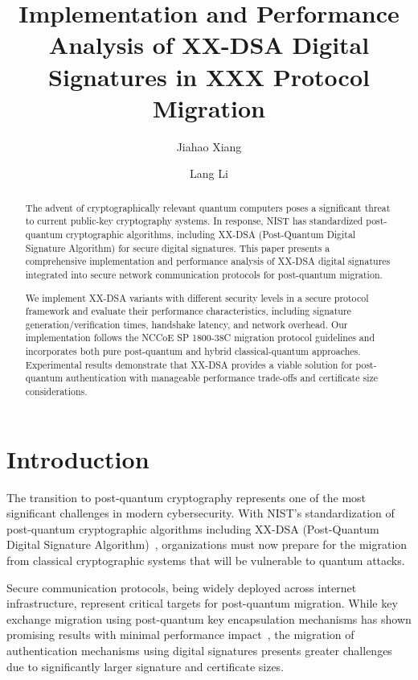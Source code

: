 \documentclass[journal=tches,final]{iacrtrans}
\author{Jiahao Xiang\inst{1} \and Lang Li\inst{1}}
\institute{
  Hengyang Normal University, College of Computer Science and Technology, Hengyang, China
}
\title[XXX Protocol with XX-DSA]{Implementation and Performance Analysis of XX-DSA Digital Signatures in XXX Protocol Migration}
\begin{document}
\maketitle



\begin{abstract}
The advent of cryptographically relevant quantum computers poses a significant threat to current public-key cryptography systems. In response, NIST has standardized post-quantum cryptographic algorithms, including XX-DSA (Post-Quantum Digital Signature Algorithm) for secure digital signatures. This paper presents a comprehensive implementation and performance analysis of XX-DSA digital signatures integrated into secure network communication protocols for post-quantum migration. 

We implement XX-DSA variants with different security levels in a secure protocol framework and evaluate their performance characteristics, including signature generation/verification times, handshake latency, and network overhead. Our implementation follows the NCCoE SP 1800-38C migration protocol guidelines and incorporates both pure post-quantum and hybrid classical-quantum approaches. Experimental results demonstrate that XX-DSA provides a viable solution for post-quantum authentication with manageable performance trade-offs and certificate size considerations.

\end{abstract}


\section{Introduction}

The transition to post-quantum cryptography represents one of the most significant challenges in modern cybersecurity. With NIST's standardization of post-quantum cryptographic algorithms including XX-DSA (Post-Quantum Digital Signature Algorithm)~\cite{NIST-PQC-Standards}, organizations must now prepare for the migration from classical cryptographic systems that will be vulnerable to quantum attacks.

Secure communication protocols, being widely deployed across internet infrastructure, represent critical targets for post-quantum migration. While key exchange migration using post-quantum key encapsulation mechanisms has shown promising results with minimal performance impact~\cite{NCCoE2023}, the migration of authentication mechanisms using digital signatures presents greater challenges due to significantly larger signature and certificate sizes.
\end{document}
